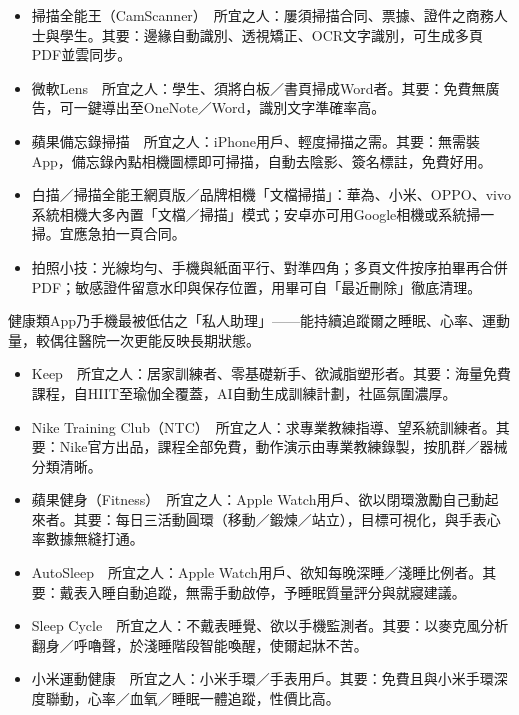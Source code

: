 \begin{itemize}
  \item 掃描全能王（CamScanner）　所宜之人：屢須掃描合同、票據、證件之商務人士與學生。其要：邊緣自動識別、透視矯正、OCR文字識別，可生成多頁PDF並雲同步。
  \item 微軟Lens　所宜之人：學生、須將白板／書頁掃成Word者。其要：免費無廣告，可一鍵導出至OneNote／Word，識別文字準確率高。
  \item 蘋果備忘錄掃描　所宜之人：iPhone用戶、輕度掃描之需。其要：無需裝App，備忘錄內點相機圖標即可掃描，自動去陰影、簽名標註，免費好用。
  \item 白描／掃描全能王網頁版／品牌相機「文檔掃描」：華為、小米、OPPO、vivo系統相機大多內置「文檔／掃描」模式；安卓亦可用Google相機或系統掃一掃。宜應急拍一頁合同。
  \item 拍照小技：光線均勻、手機與紙面平行、對準四角；多頁文件按序拍畢再合併PDF；敏感證件留意水印與保存位置，用畢可自「最近刪除」徹底清理。
\end{itemize}


健康類App乃手機最被低估之「私人助理」——能持續追蹤爾之睡眠、心率、運動量，較偶往醫院一次更能反映長期狀態。


\begin{itemize}
  \item Keep　所宜之人：居家訓練者、零基礎新手、欲減脂塑形者。其要：海量免費課程，自HIIT至瑜伽全覆蓋，AI自動生成訓練計劃，社區氛圍濃厚。
  \item Nike Training Club（NTC）　所宜之人：求專業教練指導、望系統訓練者。其要：Nike官方出品，課程全部免費，動作演示由專業教練錄製，按肌群／器械分類清晰。
  \item 蘋果健身（Fitness）　所宜之人：Apple Watch用戶、欲以閉環激勵自己動起來者。其要：每日三活動圓環（移動／鍛煉／站立），目標可視化，與手表心率數據無縫打通。
\end{itemize}


\begin{itemize}
  \item AutoSleep　所宜之人：Apple Watch用戶、欲知每晚深睡／淺睡比例者。其要：戴表入睡自動追蹤，無需手動啟停，予睡眠質量評分與就寢建議。
  \item Sleep Cycle　所宜之人：不戴表睡覺、欲以手機監測者。其要：以麥克風分析翻身／呼嚕聲，於淺睡階段智能喚醒，使爾起牀不苦。
  \item 小米運動健康　所宜之人：小米手環／手表用戶。其要：免費且與小米手環深度聯動，心率／血氧／睡眠一體追蹤，性價比高。
\end{itemize}

